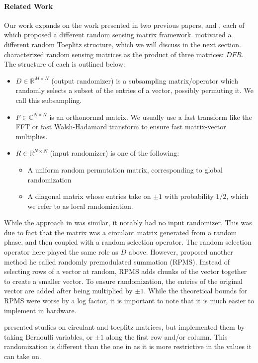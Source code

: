 \paragraph{Related Work}
Our work expands on the work presented in two previous papers, \cite{doetal} and \cite{romberg2009}, each of which proposed a different random sensing matrix framework. \cite{wotao} motivated a different random Toeplitz structure, which we will discuss in the next section. \cite{doetal} characterized random sensing matrices as the product of three matrices: $DFR$. The structure of each is outlined below:

\begin{itemize}
	\item $D\in \mathbb{R}^{M\times N}$ (output randomizer) is a subsampling matrix/operator which randomly selects a subset of the entries of a vector, possibly permuting it. We call this subsampling.
	\item $F\in\mathbb{C}^{N\times N}$ is an orthonormal matrix. We usually use a fast transform like the FFT or fast Walsh-Hadamard transform to ensure fast matrix-vector multiplies.
	\item $R\in\mathbb{R}^{N\times N}$ (input randomizer) is one of the following:
		\begin{itemize}
			\item A uniform random permutation matrix, corresponding to global randomization
			\item A diagonal matrix whose entries take on $\pm 1$ with probability $1/2$, which we refer to as local randomization.
		\end{itemize}
\end{itemize}

While the approach in \cite{romberg2009} was similar, it notably had no input randomizer. This was due to fact that the matrix was a circulant matrix generated from a random phase, and then coupled with a random selection operator. The random selection operator here played the same role as $D$ above. However, \cite{romberg2009} proposed another method he called randomly premodulated summation (RPMS). Instead of selecting rows of a vector at random, RPMS adds chunks of the vector together to create a smaller vector. To ensure randomization, the entries of the original vector are added after being multiplied by $\pm 1$. While the theoretical bounds for RPMS were worse by a log factor, it is important to note that it is much easier to implement in hardware.

\cite{wotao} presented studies on circulant and toeplitz matrices, but implemented them by taking Bernoulli variables, or $\pm1$ along the first row and/or column. This randomization is different than the one in \cite{romberg2009} as it is more restrictive in the values it can take on. 


